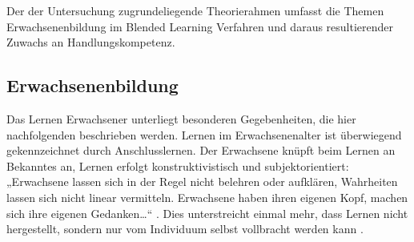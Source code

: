 \documentclass[12pt, bibliography=totoc]{scrartcl}
\begin{document}
Der der Untersuchung zugrundeliegende Theorierahmen umfasst die Themen
Erwachsenenbildung im Blended Learning Verfahren und daraus
resultierender Zuwachs an Handlungskompetenz.

\subsection{Erwachsenenbildung}\label{erwachsenenbildung}

Das Lernen Erwachsener unterliegt besonderen Gegebenheiten, die hier
nachfolgenden beschrieben werden. Lernen im Erwachsenenalter ist
überwiegend gekennzeichnet durch Anschlusslernen. Der Erwachsene knüpft
beim Lernen an Bekanntes an, Lernen erfolgt konstruktivistisch und
subjektorientiert: „Erwachsene lassen sich in der Regel nicht belehren
oder aufklären, Wahrheiten lassen sich nicht linear vermitteln.
Erwachsene haben ihren eigenen Kopf, machen sich ihre eigenen
Gedanken\ldots`` \parencite[15]{Siebert201408}. Dies unterstreicht
einmal mehr, dass Lernen nicht hergestellt, sondern nur vom Individuum
selbst vollbracht werden kann \parencite{Faulstich2012}.
\end{document}
